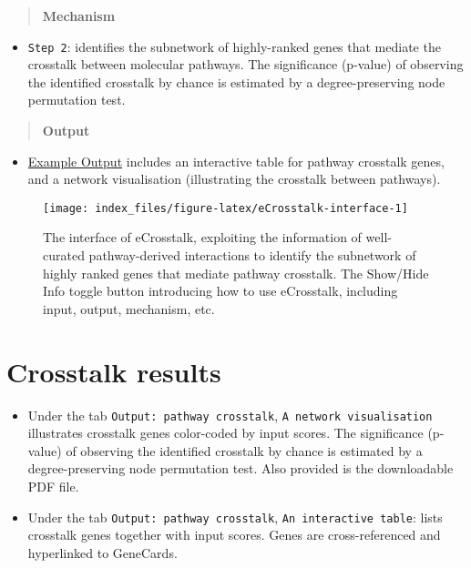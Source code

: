\documentclass[
  oneside]{book}
\providecommand{\tightlist}{%
  \setlength{\itemsep}{0pt}\setlength{\parskip}{0pt}}
\begin{document}
\begin{quote}
\textbf{Mechanism}
\end{quote}

\begin{itemize}
\tightlist
\item
  \texttt{Step\ 2}: identifies the subnetwork of highly-ranked genes that mediate the crosstalk between molecular pathways. The significance (p-value) of observing the identified crosstalk by chance is estimated by a degree-preserving node permutation test.
\end{itemize}

\begin{quote}
\textbf{Output}
\end{quote}

\begin{itemize}
\tightlist
\item
  \href{http://www.genetictargets.com/app/examples/_tmp_RMD_eCrosstalk.html}{Example Output} includes an interactive table for pathway crosstalk genes, and a network visualisation (illustrating the crosstalk between pathways).
\end{itemize}

\begin{figure}

{\centering \texttt{[image: index\_files/figure-latex/eCrosstalk-interface-1]} 

}

\caption{The interface of eCrosstalk, exploiting the information of well-curated pathway-derived interactions to identify the subnetwork of highly ranked genes that mediate pathway crosstalk. The Show/Hide Info toggle button introducing how to use eCrosstalk, including input, output, mechanism, etc.}\label{fig:eCrosstalk-interface}
\end{figure}

\hypertarget{crosstalk-results}{%
\section{Crosstalk results}\label{crosstalk-results}}

\begin{itemize}
\item
  Under the tab \texttt{Output:\ pathway\ crosstalk}, \texttt{A\ network\ visualisation} illustrates crosstalk genes color-coded by input scores. The significance (p-value) of observing the identified crosstalk by chance is estimated by a degree-preserving node permutation test. Also provided is the downloadable PDF file.
\item
  Under the tab \texttt{Output:\ pathway\ crosstalk}, \texttt{An\ interactive\ table}: lists crosstalk genes together with input scores. Genes are cross-referenced and hyperlinked to GeneCards.
\end{itemize}
\end{document}
